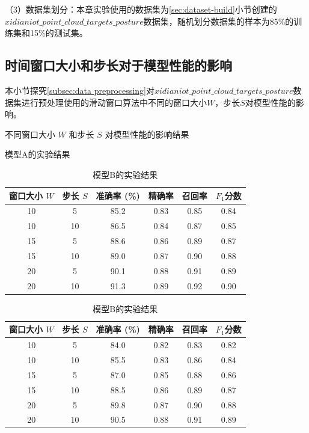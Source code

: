 （3）数据集划分：本章实验使用的数据集为\eqref{sec:dataset-build}小节创建的$xidianiot\_point\_cloud\_targets\_posture$数据集，随机划分数据集的样本为85\%的训练集和15\%的测试集。

\subsection{时间窗口大小和步长对于模型性能的影响}
本小节探究\eqref{subsec:data preprocessing}对$xidianiot\_point\_cloud\_targets\_posture$数据集进行预处理使用的滑动窗口算法中不同的窗口大小$W$，步长$S$对模型性能的影响。

\begin{table}[htbp]
    \caption{不同窗口大小 $W$ 和步长 $S$ 对模型性能的影响结果}
    \label{tab:window_step_performance}
    \centering

    \begin{subtable}{\linewidth}
        \centering
        \caption{模型A的实验结果}
        \begin{tabular}{cc|cccc}
            \toprule
            窗口大小 $W$ & 步长 $S$ & 准确率 (\%) & 精确率 & 召回率 & $F_1$分数 \\
            \midrule
            10 & 5 & 85.2 & 0.83 & 0.85 & 0.84 \\
            10 & 10 & 86.5 & 0.84 & 0.87 & 0.85 \\
            15 & 5 & 88.6 & 0.86 & 0.89 & 0.87 \\
            15 & 10 & 89.0 & 0.87 & 0.90 & 0.88 \\
            20 & 5 & 90.1 & 0.88 & 0.91 & 0.89 \\
            20 & 10 & 91.3 & 0.89 & 0.92 & 0.90 \\
            \bottomrule
        \end{tabular}
        \label{tab:modelA_performance}
    \end{subtable}

    \vspace{0.4cm} 

    \begin{subtable}{\linewidth}
        \centering
        \caption{模型B的实验结果}
        \begin{tabular}{cc|cccc}
            \toprule
            窗口大小 $W$ & 步长 $S$ & 准确率 (\%) & 精确率 & 召回率 & $F_1$分数 \\
            \midrule
            10 & 5 & 84.0 & 0.82 & 0.83 & 0.82 \\
            10 & 10 & 85.5 & 0.83 & 0.86 & 0.84 \\
            15 & 5 & 87.0 & 0.85 & 0.88 & 0.86 \\
            15 & 10 & 88.5 & 0.86 & 0.89 & 0.87 \\
            20 & 5 & 89.8 & 0.87 & 0.90 & 0.88 \\
            20 & 10 & 90.5 & 0.88 & 0.91 & 0.89 \\
            \bottomrule
        \end{tabular}
        \label{tab:modelB_performance}
    \end{subtable}
\end{table}

